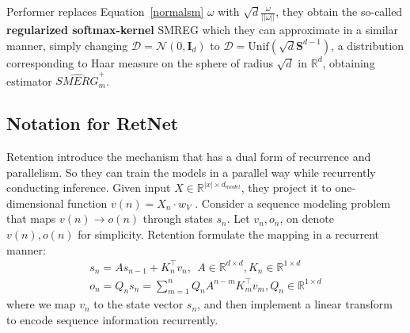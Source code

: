 \documentclass[11pt]{article}
\begin{document}
Performer replaces Equation~\ref{normalsm} $\omega$ with $\sqrt{d}\frac{\omega}{||\omega||}$, they obtain the so-called \textbf{regularized softmax-kernel} SMREG which they can approximate in
a similar manner, simply changing $\mathcal{D = N} (0, \textbf{I}_d)$ to $\mathcal{D} = \text{Unif}(\sqrt{d}\mathcal{\textbf{S}}^{d-1})$, a distribution corresponding to Haar measure on the sphere of radius $\sqrt{d}$ in $\mathbb{R}^d$, obtaining estimator $\widehat{SMERG}^+_m$. 


\subsection{Notation for RetNet}
Retention introduce the mechanism that has a dual form of recurrence and
parallelism. So they can train the models in a parallel way while recurrently conducting inference.
Given input $X\in \mathbb{R}^{|x|\times d_{model}}$, they project it to one-dimensional function $v(n) = X_n · w_V$ . Consider a sequence modeling problem that maps $v(n) \rightarrow o(n)$ through states $s_n$. Let $v_n,o_n$, on denote $v(n),o(n)$ for simplicity. Retention formulate the mapping in a recurrent manner:
\begin{equation} \label{inference1}
\begin{split}
s_n = As_{n-1} + K^\top_nv_n, \ \ A\in \mathbb{R}^{d\times d}, K_n \in \mathbb{R}^{1\times d} \\ 
o_n=Q_ns_n=\sum^n_{m=1}Q_nA^{n-m}K^\top_mv_m, Q_n \in \mathbb{R}^{1\times d}
\end{split}
\end{equation}
where we map $v_n$ to the state vector $s_n$, and then implement a linear transform to encode sequence information recurrently.
\end{document}
